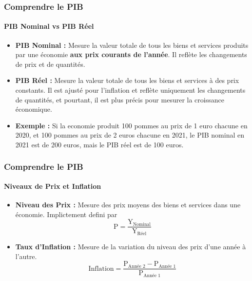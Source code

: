 \documentclass{beamer}
\begin{document}
\begin{frame}
    \frametitle{Comprendre le PIB}
    \framesubtitle{PIB Nominal vs PIB Réel}
        \begin{itemize}
            \item \textbf{PIB Nominal :} 
            Mesure la valeur totale de tous les biens et services produits par une 
            économie \textbf{aux prix courants de l'année}. 
            Il reflète les changements de prix et de quantités.
            \pause
            \item \textbf{PIB Réel :} 
            Mesure la valeur totale de tous les biens et services à des prix constants. 
            Il est ajusté pour l'inflation et reflète uniquement les changements de 
            quantités, et pourtant, il est plus précis pour mesurer la croissance économique.
            \pause
            \item \textbf{Exemple :} 
            Si la economie produit 100 pommes au prix de 1 euro chacune en 2020,
            et 100 pommes au prix de 2 euros chacune en 2021, le PIB nominal en 2021 est de 200 euros,
            mais le PIB réel est de 100 euros.
        \end{itemize}
\end{frame}

\begin{frame}
    \frametitle{Comprendre le PIB}
    \framesubtitle{Niveaux de Prix et Inflation}
    \begin{itemize}
        \item \textbf{Niveau des Prix :} 
        Mesure des prix moyens des biens et services dans une économie. 
        Implictement defini par 
        \begin{equation}
            \text{P} = \frac{\text{Y}_{\text{Nominal}}}{\text{Y}_{\text{Réel}}}
        \end{equation}
        \item \textbf{Taux d'Inflation :}
        Mesure de la variation du niveau des prix d'une année à l'autre.
        \begin{equation}
            \text{Inflation} = \frac{\text{P}_{\text{Année 2}} - \text{P}_{\text{Année 1}}}{\text{P}_{\text{Année 1}}}
        \end{equation}
    \end{itemize}
\end{frame}
\end{document}
